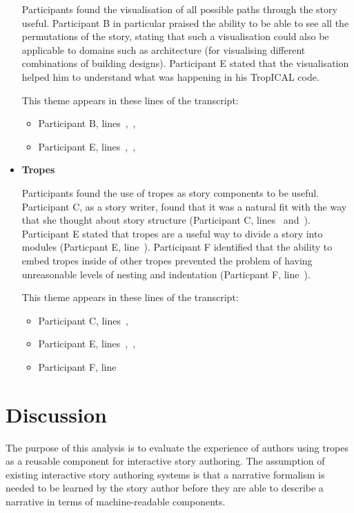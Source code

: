 \documentclass[11pt]{report}
\begin{document}
\begin{itemize}
Participants found the visualisation of all possible paths through the story
useful. Participant B in particular praised the ability to be able to see all
the permutations of the story, stating that such a visualisation could also be
applicable to domains such as architecture (for visualising different
combinations of building designs). Participant E stated that the visualisation
helped him to understand what was happening in his TropICAL code.

This theme appears in these lines of the transcript:

\begin{itemize}
\item Participant B, lines~,~,~
\item Participant E, lines~,~,~
\end{itemize}

\item \textbf{Tropes}

Participants found the use of tropes as story components to be useful.
Participant C, as a story writer, found that it was a natural fit with the way
that she thought about story structure (Participant C, lines~
and~). Participant E stated that tropes are a useful way to
divide a story into modules (Particpant E, line~).
Participant F identified that the ability to embed tropes inside of other tropes
prevented the problem of having unreasonable levels of nesting and indentation
(Particpant F, line~).

This theme appears in these lines of the transcript:
  
\begin{itemize}
\item Participant C, lines~,~
\item Participant E, lines~,~,~
\item Participant F, line~
\end{itemize}
\end{itemize}

\section{Discussion}

The purpose of this analysis is to evaluate the experience of authors using
tropes as a reusable component for interactive story authoring. The assumption
of existing interactive story authoring systems is that a narrative formalism is
needed to be learned by the story author before they are able to describe a
narrative in terms of machine-readable components.
\end{document}
